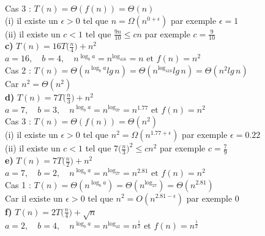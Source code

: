 \documentclass[12pt]{article}
\begin{document}
Cas 3 : \(T(n)=\Theta(f(n))= \Theta(n) \) \\

(i) il existe un \(\epsilon>0\) tel que \(n = \Omega(n^{0+\epsilon}) \) par exemple \(\epsilon=1\) \\
(ii) il existe un \(c < 1\) tel que \( \frac{9n}{10} \leq cn \) par exemple \(c=\frac{9}{10}\) \\

\textbf{c) } \(T(n)=16T\big(\frac{n}{4}\big)+n^2\) \\

\(a=16, \quad b=4, \quad n^{\log_ba} = n^{\log_416}=n \text{ et } f(n) = n^2\) \\

Cas 2 : \(T(n) = \Theta(n^{\log_ba}lg \, n) = \Theta(n^{\log_416}lg \, n) = \Theta(n^2lg \, n) \) \\

Car \(n^2 = \Theta(n^2) \) \\

\textbf{d) } \(T(n)=7T\big(\frac{n}{3}\big)+n^2\) \\

\(a=7, \quad b=3, \quad n^{\log_ba} = n^{\log_37}=n^{1.77} \text{ et } f(n) = n^2\) \\

Cas 3 : \(T(n)=\Theta(f(n))= \Theta(n^2) \) \\

(i) il existe un \(\epsilon>0\) tel que \(n^2 = \Omega(n^{1.77+\epsilon}) \) par exemple \(\epsilon=0.22\) \\
(ii) il existe un \(c < 1\) tel que \( 7 \big(\frac{n}{3} \big)^2 \leq cn^2 \) par exemple \(c=\frac{7}{9}\) \\

\textbf{e) } \(T(n)=7T\big(\frac{n}{2}\big)+n^2\) \\

\(a=7, \quad b=2, \quad n^{\log_ba} = n^{\log_27}=n^{2.81} \text{ et } f(n) = n^2\) \\

Cas 1 : \(T(n) = \Theta(n^{\log_ba}) = \Theta(n^{\log_27}) = \Theta(n^{2.81}) \) \\

Car il existe un \(\epsilon>0\) tel que \(n^2 = O(n^{2.81-\epsilon}) \) par exemple 0 \\

\textbf{f) } \(T(n)=2T\big(\frac{n}{4}\big)+\sqrt{n}\) \\

\(a=2, \quad b=4, \quad n^{\log_ba} = n^{\log_42}=n^{\frac{1}{2}} \text{ et } f(n) = n^{\frac{1}{2}}\) \\
\end{document}
